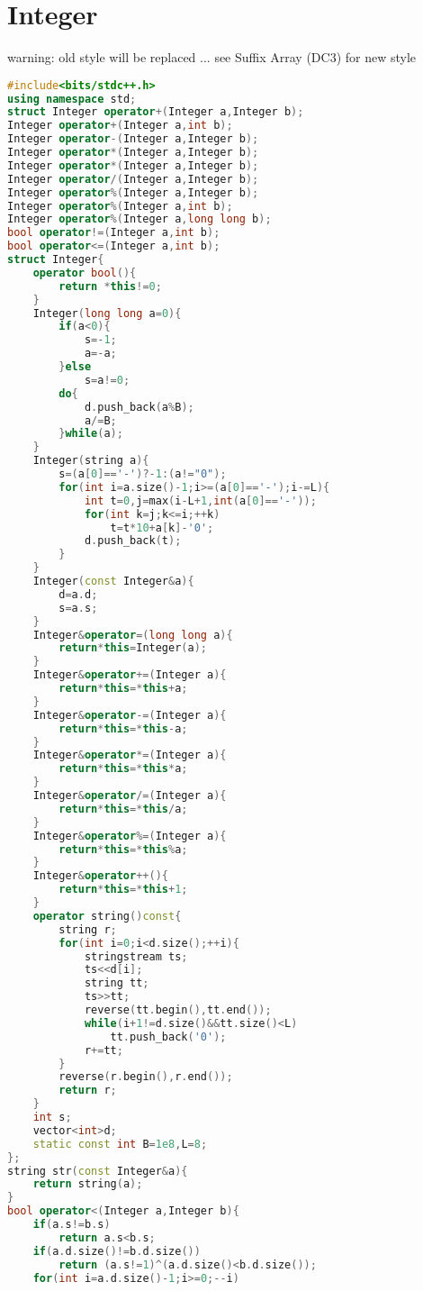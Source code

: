\documentclass{book}
\begin{document}
\section{Integer}
warning: old style will be replaced ... see Suffix Array (DC3) for new style\begin{lstlisting}[language=C++,title={Integer.hpp (6378 bytes, 269 lines)}]
#include<bits/stdc++.h>
using namespace std;
struct Integer operator+(Integer a,Integer b);
Integer operator+(Integer a,int b);
Integer operator-(Integer a,Integer b);
Integer operator*(Integer a,Integer b);
Integer operator*(Integer a,Integer b);
Integer operator/(Integer a,Integer b);
Integer operator%(Integer a,Integer b);
Integer operator%(Integer a,int b);
Integer operator%(Integer a,long long b);
bool operator!=(Integer a,int b);
bool operator<=(Integer a,int b);
struct Integer{
    operator bool(){
        return *this!=0;
    }
    Integer(long long a=0){
        if(a<0){
            s=-1;
            a=-a;
        }else
            s=a!=0;
        do{
            d.push_back(a%B);
            a/=B;
        }while(a);
    }
    Integer(string a){
        s=(a[0]=='-')?-1:(a!="0");
        for(int i=a.size()-1;i>=(a[0]=='-');i-=L){
            int t=0,j=max(i-L+1,int(a[0]=='-'));
            for(int k=j;k<=i;++k)
                t=t*10+a[k]-'0';
            d.push_back(t);
        }
    }
    Integer(const Integer&a){
        d=a.d;
        s=a.s;
    }
    Integer&operator=(long long a){
        return*this=Integer(a);
    }
    Integer&operator+=(Integer a){
        return*this=*this+a;
    }
    Integer&operator-=(Integer a){
        return*this=*this-a;
    }
    Integer&operator*=(Integer a){
        return*this=*this*a;
    }
    Integer&operator/=(Integer a){
        return*this=*this/a;
    }
    Integer&operator%=(Integer a){
        return*this=*this%a;
    }
    Integer&operator++(){
        return*this=*this+1;
    }
    operator string()const{
        string r;
        for(int i=0;i<d.size();++i){
            stringstream ts;
            ts<<d[i];
            string tt;
            ts>>tt;
            reverse(tt.begin(),tt.end());
            while(i+1!=d.size()&&tt.size()<L)
                tt.push_back('0');
            r+=tt;
        }
        reverse(r.begin(),r.end());
        return r;
    }
    int s;
    vector<int>d;
    static const int B=1e8,L=8;
};
string str(const Integer&a){
    return string(a);
}
bool operator<(Integer a,Integer b){
    if(a.s!=b.s)
        return a.s<b.s;
    if(a.d.size()!=b.d.size())
        return (a.s!=1)^(a.d.size()<b.d.size());
    for(int i=a.d.size()-1;i>=0;--i)

\end{lstlisting}
\end{document}
